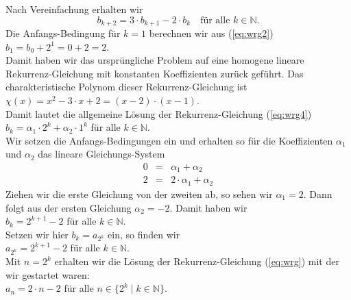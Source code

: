 Nach Vereinfachung erhalten wir 
\begin{equation}
  \label{eq:wrg4}
  b_{k+2} = 3 \cdot b_{k+1} - 2 \cdot b_k \quad \mbox{für alle $k \in \mathbb{N}$.}
\end{equation}
Die Anfangs-Bedingung für $k=1$ berechnen wir aus (\ref{eq:wrg2}) \\[0.2cm]
\hspace*{1.3cm} $b_1 = b_0 + 2^{1} = 0 + 2 = 2$. \\[0.2cm]
Damit haben wir das ursprüngliche Problem auf eine homogene lineare Rekurrenz-Gleichung
mit konstanten Koeffizienten zurück geführt.  Das charakteristische Polynom dieser
Rekurrenz-Gleichung ist \\[0.2cm]
\hspace*{1.3cm} $\chi(x) = x^2 - 3\cdot x + 2 = (x-2)\cdot(x-1)$. \\[0.2cm]
Damit lautet die allgemeine Lösung der Rekurrenz-Gleichung (\ref{eq:wrg4}) \\[0.2cm]
\hspace*{1.3cm} $b_k = \alpha_1 \cdot 2^k + \alpha_2 \cdot 1^k$ \quad für alle $k \in \mathbb{N}$. \\[0.2cm]
Wir setzen die Anfangs-Bedingungen ein und erhalten so für die Koeffizienten $\alpha_1$
und $\alpha_2$ das lineare Gleichungs-System 
\[
\begin{array}{lcl}
  0 & = & \alpha_1 + \alpha_2 \\[0.2cm]
  2 & = & 2 \cdot \alpha_1 + \alpha_2 
\end{array}
\]
Ziehen wir die erste Gleichung von der zweiten ab, so sehen wir $\alpha_1 = 2$.  Dann
folgt aus der ersten Gleichung $\alpha_2 = -2$.  Damit haben wir \\[0.2cm]
\hspace*{1.3cm} $b_k = 2^{k+1} - 2$ \quad für alle $k \in \mathbb{N}$. \\[0.2cm]
Setzen wir hier $b_k = a_{2^k}$ ein, so finden wir \\[0.2cm]
\hspace*{1.3cm} $a_{2^k} = 2^{k+1} - 2$ \quad für alle $k \in \mathbb{N}$. \\[0.2cm]
Mit $n = 2^k$ erhalten wir die Lösung der Rekurrenz-Gleichung (\ref{eq:wrg}) mit der wir 
gestartet waren: \\[0.2cm]
\hspace*{1.3cm} $a_n = 2 \cdot n - 2$ \quad für alle $n \in \{ 2^k \mid k \in \mathbb{N}\}$.  
\vspace*{0.3cm}

